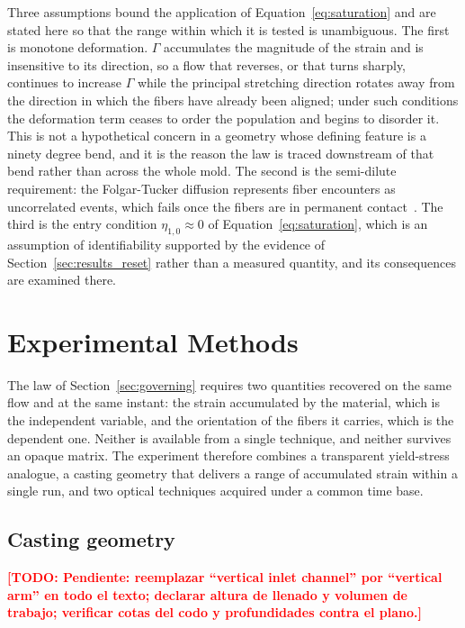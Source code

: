 \documentclass[%
  aip,
  pof,          %
  reprint,      %
  floatfix
]{revtex4-2}
\newcommand{\todo}[1]{\textcolor{red}{\textbf{[TODO: #1]}}}
\begin{document}
Three assumptions bound the application of Equation~\eqref{eq:saturation} and are stated here so that the range within which it is tested is unambiguous. The first is monotone deformation. $\Gamma$ accumulates the magnitude of the strain and is insensitive to its direction, so a flow that reverses, or that turns sharply, continues to increase $\Gamma$ while the principal stretching direction rotates away from the direction in which the fibers have already been aligned; under such conditions the deformation term ceases to order the population and begins to disorder it. This is not a hypothetical concern in a geometry whose defining feature is a ninety degree bend, and it is the reason the law is traced downstream of that bend rather than across the whole mold. The second is the semi-dilute requirement: the Folgar-Tucker diffusion represents fiber encounters as uncorrelated events, which fails once the fibers are in permanent contact~\cite{doi1986theory,petrie1999rheology}. The third is the entry condition $\eta_{1,0} \approx 0$ of Equation~\eqref{eq:saturation}, which is an assumption of identifiability supported by the evidence of Section~\ref{sec:results_reset} rather than a measured quantity, and its consequences are examined there.

\section{Experimental Methods}
\label{sec:methods}

The law of Section~\ref{sec:governing} requires two quantities recovered on the same flow and at the same instant: the strain accumulated by the material, which is the independent variable, and the orientation of the fibers it carries, which is the dependent one. Neither is available from a single technique, and neither survives an opaque matrix. The experiment therefore combines a transparent yield-stress analogue, a casting geometry that delivers a range of accumulated strain within a single run, and two optical techniques acquired under a common time base.

\subsection{Casting geometry}
\label{sec:methods_geometry}

\todo{Pendiente: reemplazar ``vertical inlet channel'' por ``vertical arm'' en todo el texto; declarar altura de llenado y volumen de trabajo; verificar cotas del codo y profundidades contra el plano.}
\end{document}
